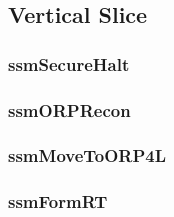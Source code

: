 \documentclass[../../main/main.tex]{subfiles}
\begin{document}
\subsection{Vertical Slice}

\subsubsection{ssmSecureHalt}

\subsubsection{ssmORPRecon}

\subsubsection{ssmMoveToORP4L}

\subsubsection{ssmFormRT}
\end{document}
